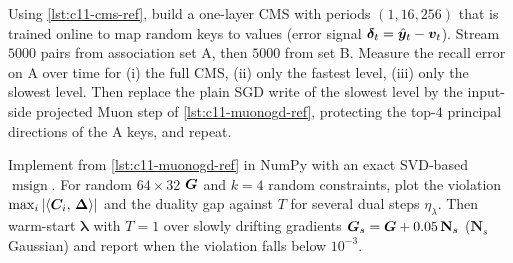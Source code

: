 \begin{exercise}\label{exr:c11-coding}
Using \cref{lst:c11-cms-ref}, build a one-layer CMS with periods $(1, 16, 256)$ that is trained
online to map random keys to values (error signal $\bm{\delta}_t = \hat{\bm{y}}_t - \bm{v}_t$). Stream $5000$
pairs from association set A, then $5000$ from set B. Measure the recall error on A over time for
(i) the full CMS, (ii) only the fastest level, (iii) only the slowest level. Then replace the plain
SGD write of the slowest level by the input-side projected Muon step of
\cref{lst:c11-muonogd-ref}, protecting the top-$4$ principal directions of the A keys, and repeat.
\end{exercise}

\begin{exercise}\label{exr:c11-dual}
Implement  from \cref{lst:c11-muonogd-ref} in NumPy with an exact SVD-based
$\operatorname{msign}$. For random $64\times32$ $\bm{G}$ and $k = 4$ random constraints, plot the
violation $\max_i\left\lvert \left\langle \bm{C}_i,\, \bm{\Delta}\right\rangle\right\rvert$ and the duality gap against $T$ for several dual
steps $\eta_\lambda$. Then warm-start $\bm{\lambda}$ with $T = 1$ over slowly drifting gradients
$\bm{G}_s = \bm{G} + 0.05\,\mathbf{N}_s$ ($\mathbf{N}_s$ Gaussian) and report when the violation falls
below $10^{-3}$.
\end{exercise}
